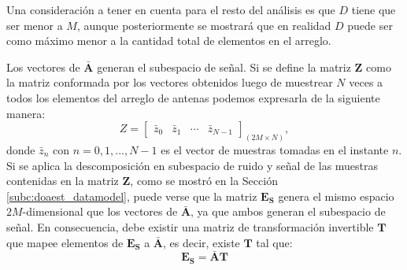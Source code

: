 Una consideración a tener en cuenta para el resto del análisis es que $D$ tiene que ser menor a $M$, aunque posteriormente se mostrará que en realidad $D$ puede ser como máximo menor a la cantidad total de elementos en el arreglo.

Los vectores de $\bar{\mathbf{A}}$ generan el subespacio de señal. Si se define la matriz $\mathbf{Z}$ como la matriz conformada por los vectores obtenidos luego de muestrear $N$ veces a todos los elementos del arreglo de antenas podemos expresarla de la siguiente manera:
\begin{equation}
    Z=\begin{bmatrix}
        \bar{z}_0 & \bar{z}_1 & \cdots & \bar{z}_{N-1}
        \label{eq:doaest_esprit_z}
    \end{bmatrix}_{(2M\times N)},
\end{equation}
donde $\bar{z}_n$ con $n=0,1,...,N-1$ es el vector de muestras tomadas en el instante $n$.
Si se aplica la descomposición en subespacio de ruido y señal de las muestras contenidas en la matriz $\mathbf{Z}$, como se mostró en la Sección \ref{subc:doaest_datamodel}, puede verse que la matriz $\mathbf{E_S}$ genera el mismo espacio $2M$-dimensional que los vectores de $\bar{\mathbf{A}}$, ya que ambos generan el subespacio de señal. En consecuencia, debe existir una matriz de transformación invertible $\mathbf{T}$ que mapee elementos de $\mathbf{E_S}$ a $\bar{\mathbf{A}}$, es decir, existe $\mathbf{T}$ tal que:
\begin{equation}
    \mathbf{E_S}=\bar{\mathbf{A}}\mathbf{T}
\end{equation}

